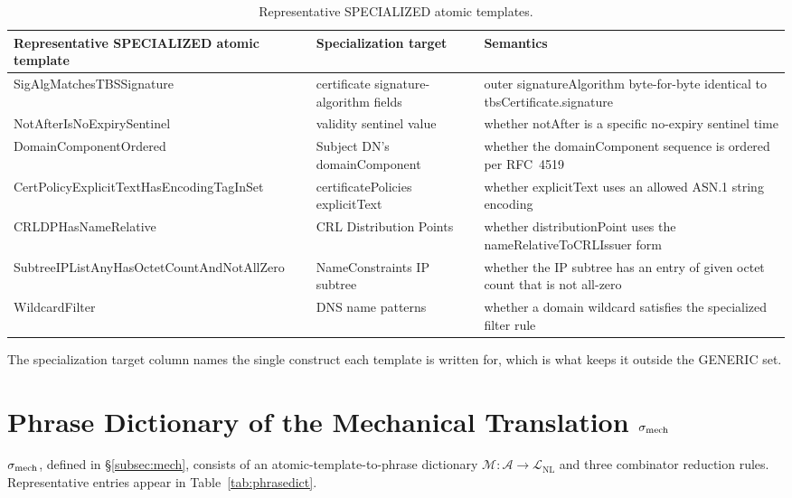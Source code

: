 \begin{table}[tb]
\centering
\footnotesize
\caption{Representative SPECIALIZED atomic templates.}
\label{tab:specialized}
\begin{tabularx}{\textwidth}{@{}p{4.6cm} p{3cm} X@{}}
\toprule
Representative SPECIALIZED atomic template & Specialization target &
  Semantics \\
\midrule
SigAlgMatchesTBSSignature & certificate signature-algorithm fields &
  outer signatureAlgorithm byte-for-byte identical to
  tbsCertificate.signature \\
NotAfterIsNoExpirySentinel & validity sentinel value & whether
  notAfter is a specific no-expiry sentinel time \\
DomainComponentOrdered & Subject DN's domainComponent &
  whether the domainComponent sequence is ordered per RFC~4519 \\
CertPolicy\-ExplicitText\-HasEncodingTagInSet & certificatePolicies
  explicitText & whether explicitText uses an allowed ASN.1 string encoding \\
CRLDPHasNameRelative & CRL Distribution Points & whether
  distributionPoint uses the nameRelativeToCRLIssuer form \\
SubtreeIPListAny\-HasOctetCount\-AndNotAllZero & NameConstraints IP subtree
  & whether the IP subtree has an entry of given octet count that is not
  all-zero \\
WildcardFilter & DNS name patterns & whether a domain wildcard
  satisfies the specialized filter rule \\
\bottomrule
\end{tabularx}
\end{table}

The specialization target column names the single construct each template is
written for, which is what keeps it outside the GENERIC set.

\section{Phrase Dictionary of the Mechanical Translation \texorpdfstring{$\sigma_{\mathrm{mech}}$}{sigma mech}}
\label{app:sigma}

$\sigma_{\mathrm{mech}}$, defined in \S\ref{subsec:mech}, consists of an
atomic-template-to-phrase dictionary $\mathcal{M} : \mathcal{A} \to
\mathcal{L}_{\mathrm{NL}}$ and three combinator reduction rules. Representative
entries appear in Table~\ref{tab:phrasedict}.

